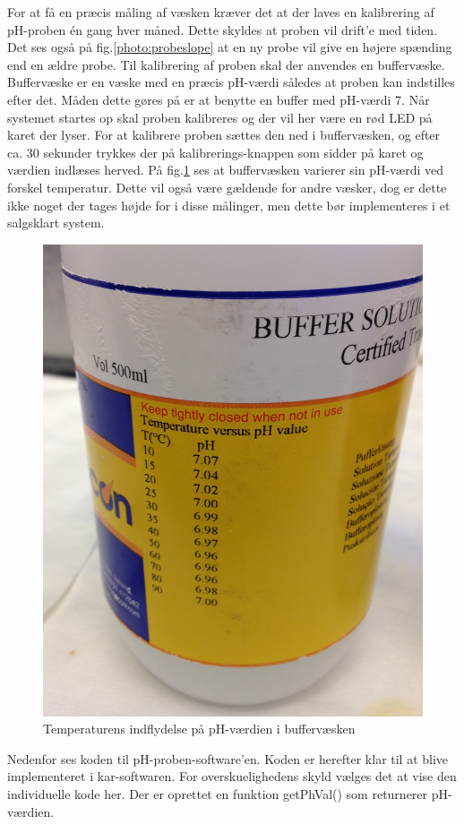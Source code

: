 For at få en præcis måling af væsken kræver det at der laves en kalibrering af pH-proben én gang hver måned. Dette skyldes at proben vil drift'e med tiden. Det ses også på fig.\ref{photo:probeslope} at en ny probe vil give en højere spænding end en ældre probe. Til kalibrering af proben skal der anvendes en buffervæske. Buffervæske er en væske med en præcis pH-værdi således at proben kan indstilles efter det. Måden dette gøres på er at benytte en buffer med pH-værdi 7. Når systemet startes op skal proben kalibreres og der vil her være en rød LED på karet der lyser. For at kalibrere proben sættes den ned i buffervæsken, og efter ca. 30 sekunder trykkes der på kalibrerings-knappen som sidder på karet og værdien indlæses herved. På fig.\ref{photo:buffer_vaeske} ses at buffervæsken varierer sin pH-værdi ved forskel temperatur. Dette vil også være gældende for andre væsker, dog er dette ikke noget der tages højde for i disse målinger, men dette bør implementeres i et salgsklart system. 

 \begin{figure}[H]
	\centering 
	\includegraphics[scale=0.1]{HardwareArkitektur/Sensore/pH_probe_billeder/buffervaeske.jpg}
	\caption{Temperaturens indflydelse på pH-værdien i buffervæsken}
	\label{photo:buffer_vaeske}
\end{figure} 
Nedenfor ses koden til pH-proben-software'en. Koden er herefter klar til at blive implementeret i kar-softwaren. For overskuelighedens skyld vælges det at vise den individuelle kode her. Der er oprettet en funktion getPhVal() som returnerer pH-værdien.

